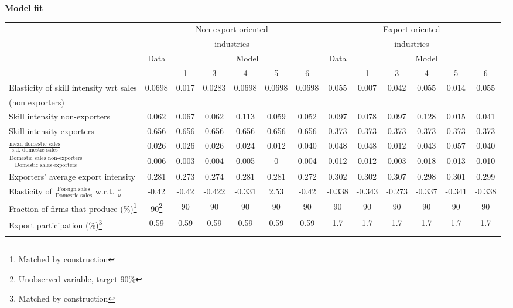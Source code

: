 \documentclass[12pt]{article}
\begin{document}
\pagebreak
\footnotesize
\begin{landscape}
\begin{center}
{\bf Model fit} \\
\begin{tabular}{ l c c c c c c c c c c c c  } \hline
& \multicolumn{6}{c}{Non-export-oriented} & \multicolumn{6}{c}{Export-oriented} \\
& \multicolumn{6}{c}{industries} & \multicolumn{6}{c}{industries} \\ 
& Data & \multicolumn{5}{c}{Model} & Data & \multicolumn{5}{c}{Model} \bigskip \\ 
& & 1 & 3 & 4 & 5 & 6 & & 1 & 3 & 4 & 5 & 6 \\ \hline \hline  
Elasticity of skill intensity wrt sales & 0.0698& 0.017  & 0.0283 &0.0698 &0.0698 &0.0698 & 0.055 & 0.007 & 0.042 & 0.055 & 0.014 & 0.055 \\ 
(non exporters) & & & & \bigskip  \\ 
 Skill intensity non-exporters & 0.062 & 0.067 & 0.062 & 0.113 & 0.059 & 0.052 & 0.097 & 0.078 & 0.097 & 0.128 & 0.015 & 0.041 \bigskip \\  \bigskip
Skill intensity exporters & 0.656 & 0.656 & 0.656 & 0.656 & 0.656 & 0.656 & 0.373 & 0.373 & 0.373 & 0.373 & 0.373 & 0.373 \\ \bigskip
$\frac{\mbox{mean domestic sales}}{\mbox{s.d. domestic sales}} $ &0.026 & 0.026 & 0.026 &0.024 & 0.012 & 0.040 & 0.048 & 0.048 & 0.012 & 0.043 & 0.057 & 0.040 \\  \bigskip
$\frac{\mbox{Domestic sales non-exporters}}{\mbox{Domestic sales exporters}} $ & 0.006 & 0.003 & 0.004 & 0.005 & 0 &0.004 & 0.012 & 0.012 & 0.003 &0.018 & 0.013 & 0.010 \\ \bigskip
Exporters' average export intensity & 0.281 & 0.273 & 0.274 & 0.281 & 0.281 & 0.272 & 0.302 & 0.302 & 0.307 & 0.298 & 0.301 & 0.299  \\ \bigskip
Elasticity of $\frac{\mbox{Foreign sales}}{\mbox{Domestic sales}}$ w.r.t. $\frac{s}{u}$ & -0.42 & -0.42 &-0.422 & -0.331 & 2.53 & -0.42 & -0.338 & -0.343 & -0.273 & -0.337 & -0.341 & -0.338  \\ \bigskip
Fraction of firms that produce (\%)\footnote{Matched by construction} & 90\footnote{Unobserved variable, target 90\%} & 90 & 90 & 90 & 90 & 90 & 90 & 90 & 90 & 90 & 90 & 90 \\ \bigskip
Export participation  (\%)\footnote{Matched by construction} & 0.59 & 0.59 & 0.59 & 0.59 & 0.59 & 0.59 & 1.7 & 1.7 & 1.7 & 1.7 & 1.7 &  1.7 \\ \bigskip

\end{tabular}
\end{center}
\end{landscape}
\end{document}
